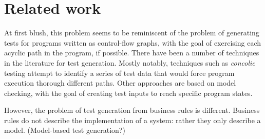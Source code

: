 
\section{Related work}

At first blush, this problem seems to be reminiscent of the problem of generating tests for programs 
written as control-flow graphs, with the goal of exercising each acyclic path in the program, if
possible.  There have been a number of techniques in the literature for test generation. Mostly
notably, techniques such as \textit{concolic} testing attempt to identify a series of test data 
that would force program execution thorough different paths.  Other approaches are based on model
checking, with the goal of creating test inputs to reach specific program states.

However, the problem of test generation from business rules is different.  Business rules do not
describe the implementation of a system: rather they only describe a model.  (Model-based test 
generation?)
